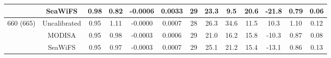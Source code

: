 \documentclass[preview]{standalone}
\begin{document}
\begin{tabular}{ccccccccccccc}
 							& SeaWiFS 		& 0.98 & 0.82 & -0.0006 & 0.0033 & 29 & 23.3 & 9.5 & 20.6 & -21.8 & 0.79 & 0.06 \\ \hline
\multirow{3}{*}{660 (665)} 	& Uncalibrated 	& 0.95 & 1.11 & -0.0000 & 0.0007 & 28 & 26.3 & 34.6 & 11.5 & 10.3 & 1.10 & 0.12 \\ 
 							& MODISA 		& 0.95 & 0.98 & -0.0003 & 0.0006 & 29 & 21.0 & 16.2 & 15.8 & -10.3 & 0.87 & 0.08\\ 
 							& SeaWiFS 		& 0.95 & 0.97 & -0.0003 & 0.0007 & 29 & 25.1 & 21.2 & 15.4 & -13.1 & 0.86 & 0.13 \\ \hline
\end{tabular}
\end{document}
